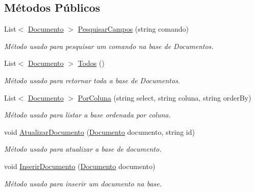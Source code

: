 \subsection*{Métodos Públicos}
\begin{DoxyCompactItemize}
\item 
List$<$ \hyperlink{class_sistema_r_h_1_1_documento}{Documento} $>$ \hyperlink{class_sistema_r_h_1_1_adaptador_af7e434caca70bdf7dfa603c6289b980a}{PesquisarCampos} (string comando)
\begin{DoxyCompactList}\small\item\em Método usado para pesquisar um comando na base de Documentos. \item\end{DoxyCompactList}\item 
List$<$ \hyperlink{class_sistema_r_h_1_1_documento}{Documento} $>$ \hyperlink{class_sistema_r_h_1_1_adaptador_a5c8bb5b7d7043e678e4af8d07dbdbcaf}{Todos} ()
\begin{DoxyCompactList}\small\item\em Método usado para retornar toda a base de Documentos. \item\end{DoxyCompactList}\item 
List$<$ \hyperlink{class_sistema_r_h_1_1_documento}{Documento} $>$ \hyperlink{class_sistema_r_h_1_1_adaptador_a052c3854a3bf089da17882811d5818a5}{PorColuna} (string select, string coluna, string orderBy)
\begin{DoxyCompactList}\small\item\em Método usado para listar a base ordenada por coluna. \item\end{DoxyCompactList}\item 
void \hyperlink{class_sistema_r_h_1_1_adaptador_a9c424957506fe5caa65b27235ce4621f}{AtualizarDocumento} (\hyperlink{class_sistema_r_h_1_1_documento}{Documento} documento, string id)
\begin{DoxyCompactList}\small\item\em Método usado para atualizar a base de documento. \item\end{DoxyCompactList}\item 
void \hyperlink{class_sistema_r_h_1_1_adaptador_abe619654cca85145989b360f54bdb5ef}{InserirDocumento} (\hyperlink{class_sistema_r_h_1_1_documento}{Documento} documento)
\begin{DoxyCompactList}\small\item\em Método usado para inserir um documento na base. \item\end{DoxyCompactList}\item 

\end{DoxyCompactItemize}
